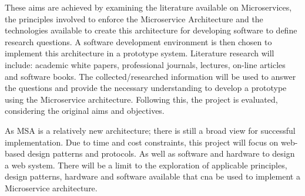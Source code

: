 	These aims are achieved by examining the literature available on Microservices, the principles involved to enforce the Microservice Architecture and the technologies available to create this architecture for developing software to define research questions.
	A software development environment is then chosen to implement this architecture in a prototype system.
	Literature research will include: academic white papers, professional journals, lectures, on-line articles and software books. The collected/researched information will be used to answer the questions and provide the necessary understanding to develop a prototype using the Microservice architecture. Following this, the project is evaluated, considering the original aims and objectives.
	
	As MSA is a relatively new architecture; there is still a broad view for successful implementation. Due to time and cost constraints, this project will focus on web-based design patterns and protocols. As well as software and hardware to design a web system. There will be a limit to the exploration of  applicable principles, design patterns, hardware and software available that cna be used to implement a Microservice architecture.
	
